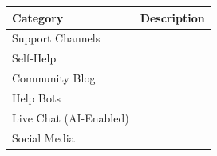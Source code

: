 \documentclass[10pt,openany]{book}
\begin{document}
\begin{longtable}[]{@{}ll@{}}
\toprule
\begin{minipage}[b]{0.26\columnwidth}\raggedright
Category\strut
\end{minipage} & \begin{minipage}[b]{0.68\columnwidth}\raggedright
Description\strut
\end{minipage}\tabularnewline
\midrule
\endhead
\begin{minipage}[t]{0.26\columnwidth}\raggedright
Support Channels\strut
\end{minipage} & \begin{minipage}[t]{0.68\columnwidth}\raggedright
\strut
\end{minipage}\tabularnewline
\begin{minipage}[t]{0.26\columnwidth}\raggedright
Self-Help\strut
\end{minipage} & \begin{minipage}[t]{0.68\columnwidth}\raggedright
\strut
\end{minipage}\tabularnewline
\begin{minipage}[t]{0.26\columnwidth}\raggedright
Community Blog\strut
\end{minipage} & \begin{minipage}[t]{0.68\columnwidth}\raggedright
\strut
\end{minipage}\tabularnewline
\begin{minipage}[t]{0.26\columnwidth}\raggedright
Help Bots\strut
\end{minipage} & \begin{minipage}[t]{0.68\columnwidth}\raggedright
\strut
\end{minipage}\tabularnewline
\begin{minipage}[t]{0.26\columnwidth}\raggedright
Live Chat (AI-Enabled)\strut
\end{minipage} & \begin{minipage}[t]{0.68\columnwidth}\raggedright
\strut
\end{minipage}\tabularnewline
\begin{minipage}[t]{0.26\columnwidth}\raggedright
Social Media\strut
\end{minipage} & \begin{minipage}[t]{0.68\columnwidth}\raggedright
\strut
\end{minipage}\tabularnewline
\bottomrule
\end{longtable}
\end{document}
